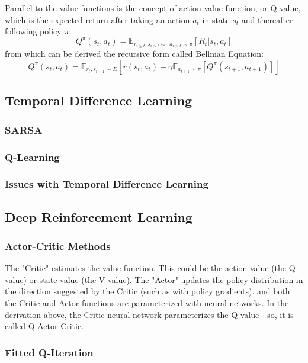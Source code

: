 Parallel to the value functions is the concept of action-value function, or Q-value, which is the expected return after taking an action \(a_t\) in state \(s_t\) and thereafter following policy \(\pi\):
\[Q^\pi(s_t,a_t)=\mathbb{E}_{r_{i \geq t},s_{i>t} \sim ,a_{i>t} \sim \pi}[R_t|s_t,a_t]\]
from which can be derived the recursive form called Bellman Equation:
\[Q^\pi(s_t,a_t)=\mathbb{E}_{r_t,s_{t+1} \sim E }\left[ r(s_t,a_t) + \gamma \mathbb{E}_{a_{t+1} \sim \pi}\left[Q^\pi (s_{t+1},a_{t+1})\right]\right]\]


\subsection{Temporal Difference Learning}
\subsubsection{SARSA}

\subsubsection{Q-Learning}
\subsubsection{Issues with Temporal Difference Learning}
\subsection{Deep Reinforcement Learning}

\subsubsection{Actor-Critic Methods}
The "Critic" estimates the value function. This could be the action-value (the Q value) or state-value (the V value).
The "Actor" updates the policy distribution in the direction suggested by the Critic (such as with policy gradients).
and both the Critic and Actor functions are parameterized with neural networks. In the derivation above, the Critic neural network parameterizes the Q value - so, it is called Q Actor Critic.
\subsubsection{Fitted Q-Iteration}


